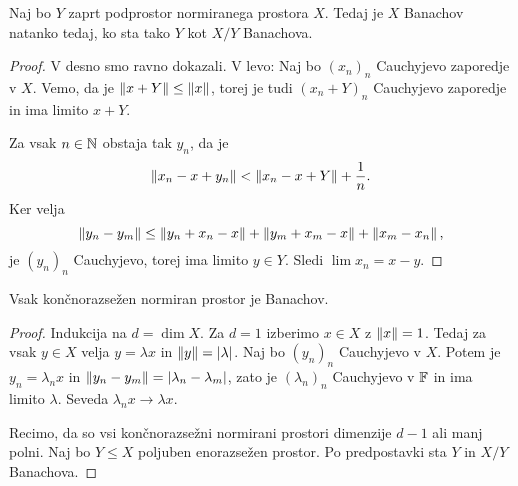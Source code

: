 \begin{trditev}
  Naj bo $Y$ zaprt podprostor normiranega prostora $X$.
  Tedaj je $X$ Banachov natanko tedaj, ko sta tako $Y$ kot $X/Y$ Banachova.
\end{trditev}

\begin{proof}
  V desno smo ravno dokazali.
  V levo:
  Naj bo $(x_n)_n$ Cauchyjevo zaporedje v $X$.
  Vemo, da je $\left\lVert x + Y\right\rVert \le \left\lVert x\right\rVert$, torej je tudi $(x_n + Y)_n$
  Cauchyjevo zaporedje in ima limito $x + Y$.

  Za vsak $n \in \mathbb{N}$ obstaja tak $y_n$, da je
  \[
	\left\lVert x_n - x + y_n\right\rVert < \left\lVert x_n - x + Y\right\rVert + \frac{1}{n}.
  \]
  Ker velja
  \[
	\left\lVert y_n - y_m\right\rVert \le \left\lVert y_n + x_n - x\right\rVert + \left\lVert y_m + x_m - x\right\rVert + \left\lVert x_m
	- x_n\right\rVert,
  \]
  je $(y_n)_n$ Cauchyjevo, torej ima limito $y \in Y$.
  Sledi $\lim x_n = x - y$.
\end{proof}

\begin{posledica}
  Vsak končnorazsežen normiran prostor je Banachov.
\end{posledica}

\begin{proof}
  Indukcija na $d = \dim X$.
  Za $d = 1$ izberimo $x \in X$ z $\left\lVert x\right\rVert = 1$.
  Tedaj za vsak $y \in X$ velja $y = \lambda x$ in $\left\lVert y\right\rVert = \left| \lambda \right|$.
  Naj bo $(y_n)_n$ Cauchyjevo v $X$.
  Potem je $y_n = \lambda_n x$ in $\left\lVert y_n - y_m\right\rVert = \left| \lambda_n -
	\lambda_m \right|$,
  zato je $(\lambda_n)_n$ Cauchyjevo v $\mathbb{F}$ in ima limito $\lambda$.
  Seveda $\lambda_n x \to \lambda x$.

  Recimo, da so vsi končnorazsežni normirani prostori dimenzije $d-1$ ali manj
  polni.
  Naj bo $Y \le X$ poljuben enorazsežen prostor.
  Po predpostavki sta $Y$ in $X/Y$ Banachova.
\end{proof}

